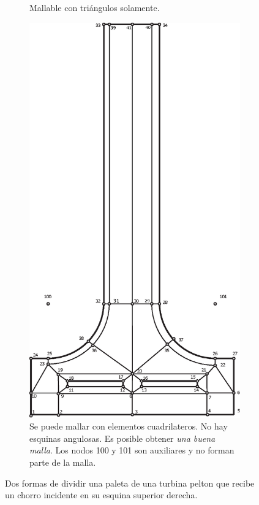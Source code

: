 \documentclass[11pt, a4paper,titlepage]{article}
\begin{document}
\begin{figure}[htb!]
\begin{subfigure}{0.49\textwidth}
		\caption{Mallable con triángulos solamente.}
	\end{subfigure}
	\begin{subfigure}{0.49\textwidth}
		\centering
	\includegraphics[width=.7\linewidth]{fig/divisionPelton2.eps}
	\caption{Se puede mallar con elementos cuadrilateros. No hay esquinas angulosas. Es posible obtener \textit{una buena malla}. Los nodos 100 y 101 son auxiliares y no forman parte de la malla.}
	\label{fig:buendivisiondominio}
	\end{subfigure}
	\caption{Dos formas de dividir una paleta de una turbina pelton que recibe un chorro incidente en su esquina superior derecha.}
\end{figure}
\end{document}
